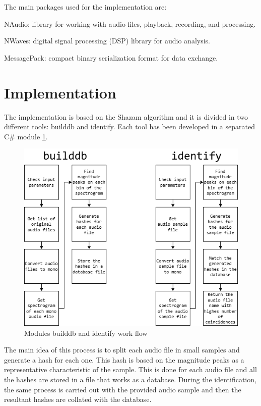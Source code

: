 \documentclass[11pt, a4paper]{article}
\begin{document}
    The main packages used for the implementation are:
    \begin{list}
        \item NAudio: library for working with audio files, playback, recording, and processing.
        \item NWaves: digital signal processing (DSP) library for audio analysis.
        \item MessagePack: compact binary serialization format for data exchange.
    \end{list}

    \section{Implementation}

    The implementation is based on the Shazam algorithm \cite{ShazamAlgorithmPaper} and it is divided in two different tools: builddb 
    and identify. Each tool has been developed in a separated C# module \ref{fig:builddb_identify_block_diagram}.

    \begin{figure}[h]
        \centering
        \includegraphics[width=\textwidth]{media/builddb_identify_block_diagram.png}
        \caption{Modules builddb and identify work flow}
        \label{fig:builddb_identify_block_diagram}
    \end{figure}

    The main idea of this process is to split each audio file in small samples and generate a hash for each one. This hash is based on the 
    magnitude peaks as a representative characteristic of the sample. This is done for each audio file and all the hashes are stored in a file 
    that works as a database. During the identification, the same process is carried out with the provided audio sample and then the resultant 
    hashes are collated with the database.
\end{document}
